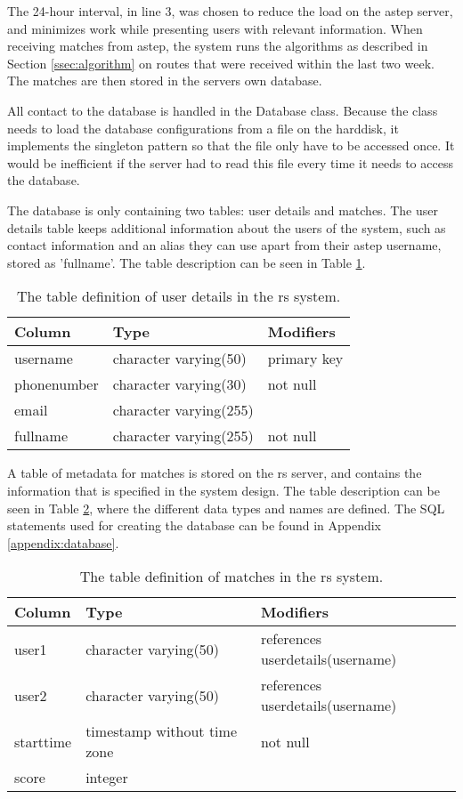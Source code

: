 The 24-hour interval, in line 3, was chosen to reduce the load on the \gls{astep} server, and minimizes work while presenting users with relevant information.
When receiving matches from \gls{astep}, the system runs the algorithms as described in Section \ref{ssec:algorithm} on routes that were received within the last two week.
The matches are then stored in the servers own database.

All contact to the database is handled in the Database class.
Because the class needs to load the database configurations from a file on the harddisk, it implements  the singleton pattern so that the file only have to be accessed once.
It would be inefficient if the server had to read this file every time it needs to access the database.

The database is only containing two tables: user details and matches.
The user details table keeps additional information about the users of the system, such as contact information and an alias they can use apart from their \gls{astep} username, stored as 'fullname'.
The table description can be seen in Table \ref{tab:userdetails}.

\begin{table}[h]
	\centering
	\begin{tabular}{l l l}
		Column 		& Type                   & Modifiers\\\hline
		username    & character varying(50)  & primary key\\
		phonenumber & character varying(30)  & not null\\
		email       & character varying(255) &\\
		fullname    & character varying(255) & not null\\
	\end{tabular}
	\caption{The table definition of user details in the \gls{rs} system.}
	\label{tab:userdetails}
\end{table}

A table of metadata for matches is stored on the \gls{rs} server, and contains the information that is specified in the system design. 
The table description can be seen in Table \ref{tab:matches}, where the different data types and names are defined.
The SQL statements used for creating the database can be found in Appendix \ref{appendix:database}.

\begin{table}[h]
	\centering
	\begin{tabular}{l l l}
			   Column  &            Type             & Modifiers\\\hline
			 user1     & character varying(50)       & references userdetails(username)\\
			 user2     & character varying(50)       & references userdetails(username)\\
			 starttime & timestamp without time zone & not null\\
			 score     & integer                     &
	\end{tabular}
	\caption{The table definition of matches in the \gls{rs} system.}
	\label{tab:matches}
\end{table}

